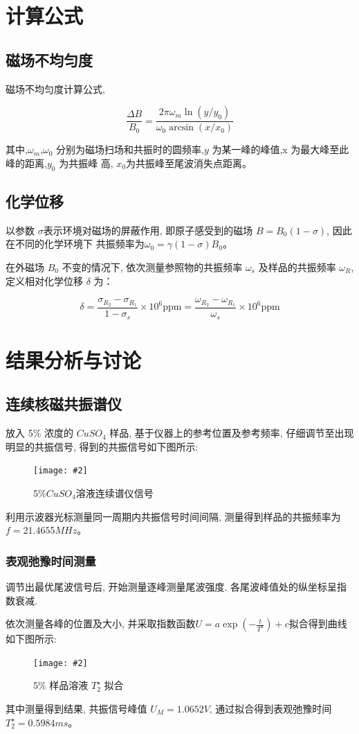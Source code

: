 \documentclass[12pt,a4paper]{article}
\newcommand{\be}[1]{
    \begin{equation}
        #1
    \end{equation}
}
\newcommand{\bfig}[3]{
    \begin{figure}[H]
        \centering
        \texttt{[image: \#2]}
        \caption{#3}
    \end{figure}
}
\begin{document}
\section{计算公式}
\subsection{磁场不均匀度}
磁场不均匀度计算公式,
\be{\frac{\Delta B}{B_{0}}=\frac{2 \pi \omega_{m} \ln \left(y / y_{0}\right)}{\omega_{0} \arcsin \left(x / x_{0}\right)}}
其中,$\omega_m$,$\omega_0$  分别为磁场扫场和共振时的圆频率,$y$ 为某一峰的峰值,x 为最大峰至此峰的距离,$y_0$ 为共振峰
高, $x_{0}$为共振峰至尾波消失点距离。
\subsection{化学位移}
以参数 $\sigma$表示环境对磁场的屏蔽作用, 即原子感受到的磁场 $B=B_{0}(1-\sigma)$, 因此在不同的化学环境下
共振频率为$\omega_{0}=\gamma(1-\sigma) B_{0}$。

在外磁场 $B_0$ 不变的情况下, 依次测量参照物的共振频率 $\omega_s$ 及样品的共振频率 $\omega_R$, 定义相对化学位移
$\delta$ 为：
\be{\delta=\frac{\sigma_{R_{2}}-\sigma_{R_{1}}}{1-\sigma_{s}} \times 10^{6} \mathrm{ppm}=\frac{\omega_{R_{2}}-\omega_{R_{1}}}{\omega_{s}} \times 10^{6} \mathrm{ppm}}

\section{结果分析与讨论}
\subsection{连续核磁共振谱仪}
放入 5\% 浓度的 $CuS O_4$ 样品, 基于仪器上的参考位置及参考频率, 仔细调节至出现明显的共振信号,
得到的共振信号如下图所示:
\bfig{0.7}{5连续谱.jpg}{5\%$CuSO_4$溶液连续谱仪信号}
利用示波器光标测量同一周期内共振信号时间间隔, 测量得到样品的共振频率为 $f = 21.4655MHz$。

\subsubsection{表观弛豫时间测量}
调节出最优尾波信号后, 开始测量逐峰测量尾波强度. 各尾波峰值处的纵坐标呈指数衰减. 

依次测量各峰的位置及大小, 并采取指数函数$U=a \exp \left(-\frac{t}{T^{\star}}\right)+c$拟合得到曲线如下图所示:
\bfig{0.6}{5弛豫时间拟合.png}{5\% 样品溶液 $T_2^{\star}$ 拟合}
其中测量得到结果, 共振信号峰值 $U_M = 1.0652V$, 通过拟合得到表观弛豫时间 $T_2^{\star} = 0.5984ms$。
\end{document}
